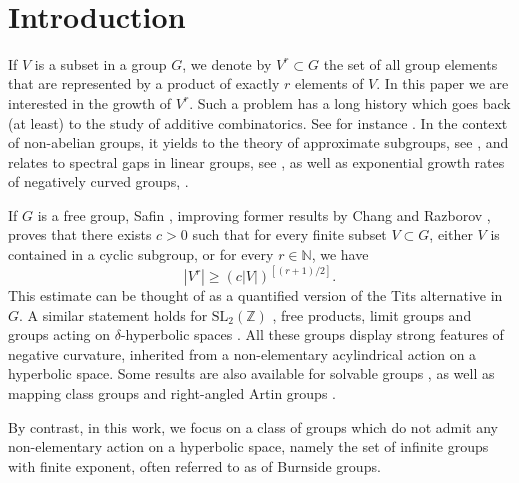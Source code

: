 \documentclass[11pt]{article}
\theoremstyle{plain}
\theoremstyle{definition}
\begin{document}

\vspace*{-4\baselineskip}
\mbox{ }
\section{Introduction}
If $V$ is a subset in a group $G$, we denote by $V^r\subset G$ the set of all group elements that are represented by a product of exactly $r$ elements of $V$.
In this paper we are interested in the growth of $V^r$.
Such a problem has a long history which goes back (at least) to the study of additive combinatorics. See for instance \cite{nathanson_additive_1996, tao_additive_2006}.
In the context of non-abelian groups, it yields to the theory of approximate subgroups, see \cite{terence_product_2008,breuillard_structure_2012}, and relates to spectral gaps in linear groups, see
\cite{helfgott_growth_2008,bourgain_spectral_2008,bourgain_spectral_2012}, as well as exponential growth rates of negatively curved groups, \cite{koubi_croissance_1998,arzhantseva_lower_2006,breuillard_joint_2018,fujiwara_rates_2020}.

If $G$ is a free group, Safin \cite{safin_powers_2011}, improving former results by Chang \cite{chang_product_2008} and Razborov \cite{razborov_product_2014}, proves that there exists $c > 0$ such that for every finite subset $V \subset G$, either $V$ is contained in a cyclic subgroup, or for every $r \in \mathbb N$, we have
\begin{equation*}
|V^r| \geq (c |V|)^{[(r+1)/2]}.
\end{equation*}
This estimate can be thought of as a quantified version of the Tits alternative in $G$.
A similar statement holds for $\mathrm{SL}_2(\mathbb{Z})$ \cite{chang_product_2008}, free products, limit groups \cite{button_explicit_2013} and groups acting on $\delta$-hyperbolic spaces \cite{delzant_product_2020}. All these groups display strong features of negative curvature, inherited from a non-elementary acylindrical action on a hyperbolic space.
Some results are also available for solvable groups \cite{tao_freiman_2010,button_explicit_2013}, as well as mapping class groups and right-angled Artin groups \cite{kerr_product_2021}.

By contrast, in this work, we focus on a class of groups which do not admit any non-elementary action on a hyperbolic space, namely the set of infinite groups with finite exponent, often referred to as of Burnside groups.
\end{document}
